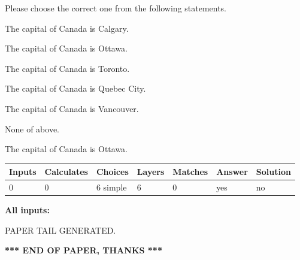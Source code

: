 \documentclass[12pt]{article}
\begin{document}
  
Please choose the correct one from the following statements.
 
 
The capital of Canada is Calgary.
 
 
The capital of Canada is Ottawa.
 
 
The capital of Canada is Toronto.
 
 
The capital of Canada is Quebec City.
 
 
The capital of Canada is Vancouver.
 
 
 None of above.
 
 
\noindent{}
 
 
The capital of Canada is Ottawa.
 
 
\noindent{}
 
 
   
   
   
   
\noindent\begin{tabular}{|l|l|l|l|l|l|l|}
 \hline
Inputs & Calculates & Choices & Layers & Matches & Answer & Solution \\ \hline
 0  & 
 0  & 
 6
  simple  
  & 
 6  & 
 0  & 
  yes & 
  no 
  \\ \hline
 \end{tabular}
   
   
   
   
\noindent{}
   
   
   
   
\noindent\vspace{0.1in}\hspace{-0.08in} {\textbf{\Large{All inputs: }}}
   
   
   
   
   
   
 \vspace{0.2in}
 
   
   
\vspace{2.0in} PAPER TAIL GENERATED.
   
   
   
   
\vspace{1.0in} 
{\textbf{\large{ *** END OF PAPER, THANKS *** }}} 
   
\end{document}
